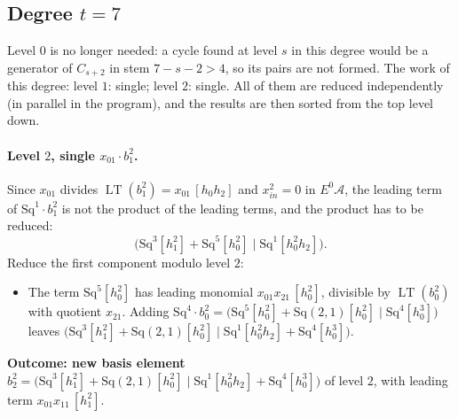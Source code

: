 \documentclass[11pt]{article}
\newcommand{\Sq}{\mathrm{Sq}}
\DeclareMathOperator{\LT}{LT}
\begin{document}
\subsection*{Degree $t = 7$}
\noindent Level $0$ is no longer needed: a cycle found at level $s$ in this degree would be a generator of $C_{s+2}$ in stem $7-s-2 > 4$, so its pairs are not formed.
\noindent The work of this degree: level $1$: single; level $2$: single. All of them are reduced independently (in parallel in the program), and the results are then sorted from the top level down.
\medskip
\paragraph{Level $2$, single $x_{01}\cdot b^{2}_{1}$.} Since $x_{01}$ divides $\LT(b^{2}_{1}) = x_{01}\,[h_0h_2]$ and $x_{in}^2 = 0$ in $E^0\mathcal A$, the leading term of $\Sq^{1}\cdot b^{2}_{1}$ is not the product of the leading terms, and the product has to be reduced:
\[\bigl(\Sq^{3}[h_1^2] + \Sq^{5}[h_0^2] \;\big|\; \Sq^{1}[h_0^2h_2]\bigr).\]
Reduce the first component modulo level $2$:
\begin{itemize}
\item The term $\Sq^{5}[h_0^2]$ has leading monomial $x_{01}x_{21}\,[h_0^2]$, divisible by $\LT(b^{2}_{0})$ with quotient $x_{21}$. Adding $\Sq^{4}\cdot b^{2}_{0} = \bigl(\Sq^{5}[h_0^2] + \Sq(2,1)[h_0^2] \;\big|\; \Sq^{4}[h_0^3]\bigr)$ leaves $\bigl(\Sq^{3}[h_1^2] + \Sq(2,1)[h_0^2] \;\big|\; \Sq^{1}[h_0^2h_2] + \Sq^{4}[h_0^3]\bigr)$.
\end{itemize}
\textbf{Outcome: new basis element} $b^{2}_{2} = \bigl(\Sq^{3}[h_1^2] + \Sq(2,1)[h_0^2] \;\big|\; \Sq^{1}[h_0^2h_2] + \Sq^{4}[h_0^3]\bigr)$ of level $2$, with leading term $x_{01}x_{11}\,[h_1^2]$.
\medskip
\end{document}
